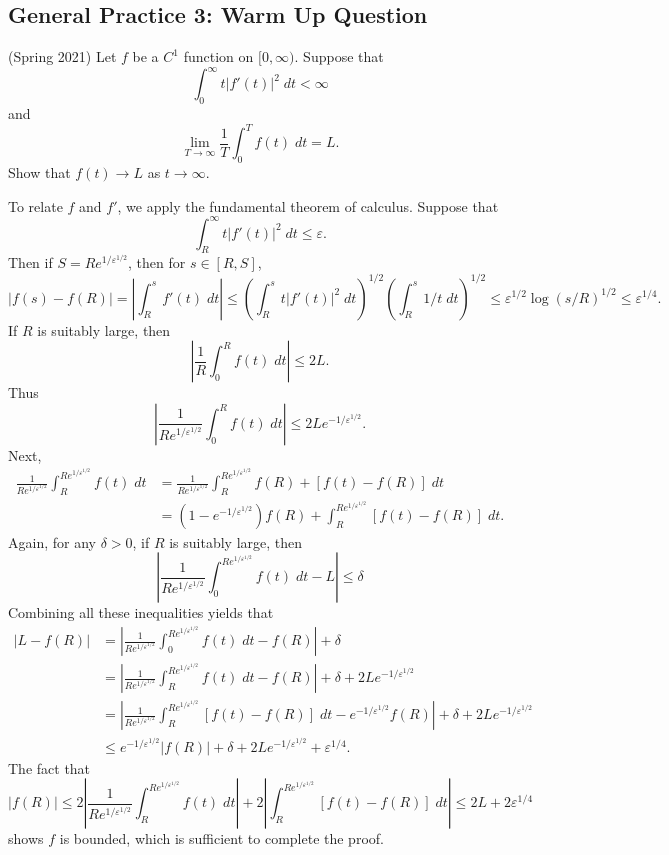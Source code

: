 \documentclass[answers]{exam}
\begin{document}
\begin{questions}
\newpage
\section{General Practice 3: Warm Up Question}

\question (Spring 2021) Let $f$ be a $C^1$ function on $[0,\infty)$. Suppose that
%
\[ \int_0^\infty t |f'(t)|^2\; dt < \infty \]
%
and
%
\[ \lim_{T \to \infty} \frac{1}{T} \int_0^T f(t)\; dt = L. \]
%
Show that $f(t) \to L$ as $t \to \infty$.
\begin{solution}
    To relate $f$ and $f'$, we apply the fundamental theorem of calculus. Suppose that
    \[ \int_R^\infty t |f'(t)|^2\; dt \leq \varepsilon. \]
    Then if $S = R e^{1/\varepsilon^{1/2}}$, then for $s \in [R,S]$,
    \[ |f(s) - f(R)| = \left| \int_R^s f'(t)\; dt \right| \leq \left( \int_R^s t |f'(t)|^2\; dt \right)^{1/2} \left( \int_R^s 1/t\; dt \right)^{1/2} \leq \varepsilon^{1/2} \log(s/R)^{1/2} \leq \varepsilon^{1/4}. \]
    If $R$ is suitably large, then
    \[ \left| \frac{1}{R} \int_0^R f(t)\; dt \right| \leq 2L. \]
    Thus
    \[ \left| \frac{1}{R e^{1/\varepsilon^{1/2}}} \int_0^R f(t)\; dt \right| \leq 2L e^{-1/\varepsilon^{1/2}}. \]
    Next,
    \begin{align*}
        \frac{1}{R e^{1/\varepsilon^{1/2}}} \int_R^{Re^{1/\varepsilon^{1/2}}} f(t)\; dt &= \frac{1}{R e^{1/\varepsilon^{1/2}}} \int_R^{Re^{1/\varepsilon^{1/2}}} f(R) + [f(t) - f(R)]\; dt\\
        &= \left( 1 - e^{-1/\varepsilon^{1/2}} \right) f(R) + \int_R^{R e^{1/\varepsilon^{1/2}}} [f(t) - f(R)]\; dt.
    \end{align*}
    Again, for any $\delta > 0$, if $R$ is suitably large, then
    \[ \left| \frac{1}{R e^{1/\varepsilon^{1/2}}} \int_0^{R e^{1/\varepsilon^{1/2}}} f(t)\; dt - L \right| \leq \delta \]
    Combining all these inequalities yields that
    \begin{align*}
        |L - f(R)| &= \left| \frac{1}{R e^{1/\varepsilon^{1/2}}} \int_0^{R e^{1/\varepsilon^{1/2}}} f(t)\; dt - f(R) \right| + \delta\\
        &= \left| \frac{1}{R e^{1/\varepsilon^{1/2}}} \int_R^{R e^{1/\varepsilon^{1/2}}} f(t)\; dt - f(R) \right| + \delta + 2Le^{-1/\varepsilon^{1/2}}\\
        &= \left| \frac{1}{R e^{1/\varepsilon^{1/2}}} \int_R^{R e^{1/\varepsilon^{1/2}}} [f(t) - f(R)]\; dt - e^{-1/\varepsilon^{1/2}} f(R) \right| + \delta + 2Le^{-1/\varepsilon^{1/2}}\\
        &\leq e^{-1/\varepsilon^{1/2}} |f(R)| + \delta + 2L e^{-1/\varepsilon^{1/2}} + \varepsilon^{1/4}.
    \end{align*}
    The fact that
    \[ |f(R)| \leq 2 \left| \frac{1}{R e^{1/\varepsilon^{1/2}}} \int_R^{Re^{1/\varepsilon^{1/2}}} f(t)\; dt \right| + 2 \left| \int_R^{R e^{1/\varepsilon^{1/2}}} [f(t) - f(R)]\; dt \right| \leq 2L + 2 \varepsilon^{1/4} \]
    shows $f$ is bounded, which is sufficient to complete the proof.


\end{solution}
\end{questions}
\end{document}
